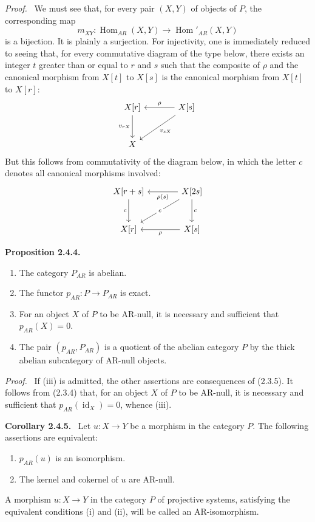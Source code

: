 \documentclass[11pt]{article}
\newenvironment{statement}[1]{\par\medskip\noindent\textbf{#1.}\ }{\par\medskip}
\newenvironment{prooftext}[1][Proof]{\par\noindent\emph{#1.}\ }{\par\medskip}
\DeclareMathOperator{\Hom}{Hom}
\providecommand{\id}{\operatorname{id}}
\providecommand{\Hom}{\operatorname{Hom}}
\providecommand{\id}{\operatorname{id}}
\providecommand{\id}{\operatorname{id}}
\providecommand{\id}{\operatorname{id}}
\providecommand{\id}{\operatorname{id}}
\providecommand{\Hom}{\operatorname{Hom}}
\providecommand{\id}{\operatorname{id}}
\begin{document}
\begin{prooftext}[Proof]
We must see that, for every pair $(X,Y)$ of objects of $P$, the corresponding map
\[
m_{XY}:\Hom_{AR}(X,Y)\longrightarrow\Hom'_{AR}(X,Y)
\]
is a bijection. It is plainly a surjection. For injectivity, one is immediately reduced to seeing that, for every commutative diagram of the type below, there exists an integer $t$ greater than or equal to $r$ and $s$ such that the composite of $\rho$ and the canonical morphism from $X[t]$ to $X[s]$ is the canonical morphism from $X[t]$ to $X[r]$:
\[
\begin{tikzcd}[column sep=large,row sep=large]
X[r] \arrow[d,"{v_{rX}}"'] & X[s] \arrow[l,"\rho"'] \arrow[dl,"{v_{sX}}"]\\
X & {}
\end{tikzcd}
\]
But this follows from commutativity of the diagram below, in which the letter $c$ denotes all canonical morphisms involved:
\[
\begin{tikzcd}[column sep=large,row sep=large]
X[r+s] \arrow[d,"c"'] & X[2s] \arrow[l,"\rho(s)"] \arrow[d,"c"] \arrow[dl,"c" description]\\
X[r] & X[s] \arrow[l,"\rho"]
\end{tikzcd}
\]
\end{prooftext}

\begin{statement}{Proposition 2.4.4}
\begin{enumerate}[label=(\roman*)]
\item The category $P_{AR}$ is abelian.
\item The functor $p_{AR}:P\to P_{AR}$ is exact.
\item For an object $X$ of $P$ to be AR-null, it is necessary and sufficient that $p_{AR}(X)=0$.
\item The pair $(p_{AR},P_{AR})$ is a quotient of the abelian category $P$ by the thick abelian subcategory of AR-null objects.
\end{enumerate}
\end{statement}

\begin{prooftext}[Proof]
If (iii) is admitted, the other assertions are consequences of (2.3.5). It follows from (2.3.4) that, for an object $X$ of $P$ to be AR-null, it is necessary and sufficient that $p_{AR}(\id_X)=0$, whence (iii).
\end{prooftext}

\begin{statement}{Corollary 2.4.5}
Let $u:X\to Y$ be a morphism in the category $P$. The following assertions are equivalent:
\begin{enumerate}[label=(\roman*)]
\item $p_{AR}(u)$ is an isomorphism.
\item The kernel and cokernel of $u$ are AR-null.
\end{enumerate}
A morphism $u:X\to Y$ in the category $P$ of projective systems, satisfying the equivalent conditions (i) and (ii), will be called an AR-isomorphism.
\end{statement}
\end{document}
